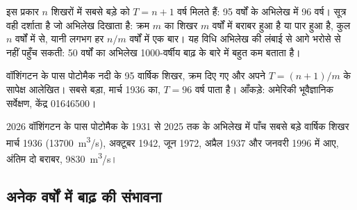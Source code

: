 इस प्रकार $n$ शिखरों में सबसे बड़े को $T = n + 1$ वर्ष मिलते हैं:
\num{95} वर्षों के अभिलेख में \num{96} वर्ष। सूत्र वही दर्शाता है जो अभिलेख दिखाता है:
क्रम $m$ का शिखर $m$ वर्षों में बराबर हुआ है या पार हुआ है, कुल $n$ वर्षों में से,
यानी लगभग हर $n/m$ वर्षों में एक बार। यह विधि अभिलेख की लंबाई से आगे भरोसे से
नहीं पहुँच सकती: \num{50} वर्षों का अभिलेख
\num{1000}-वर्षीय बाढ़ के बारे में बहुत कम बताता है।

\begin{omfigure}

{\small वॉशिंगटन के पास पोटोमैक नदी के \num{95} वार्षिक शिखर, क्रम दिए गए
और अपने  $T = (n+1)/m$ के सापेक्ष आलेखित। सबसे बड़ा, मार्च
1936 का, $T = 96$ वर्ष पाता है। आँकड़े: अमेरिकी भूवैज्ञानिक सर्वेक्षण, केंद्र 01646500।}
\end{omfigure}

\begin{dated}{2026}
वॉशिंगटन के पास पोटोमैक के 1931 से 2025 तक के अभिलेख में पाँच
सबसे बड़े वार्षिक शिखर मार्च 1936 (\qty{13700}{m^3/s}), अक्टूबर 1942,
जून 1972, अप्रैल 1937 और जनवरी 1996 में आए, अंतिम दो बराबर,
\qty{9830}{m^3/s}।
\end{dated}

\subsection*{अनेक वर्षों में बाढ़ की संभावना}

